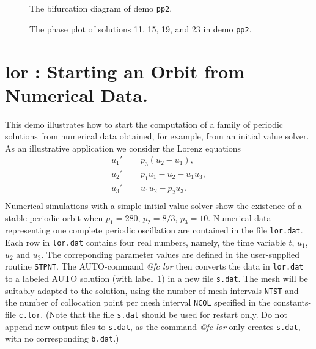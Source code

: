 \documentclass[12pt]{report}
\begin{document}
\begin{figure}[p]
\epsfysize 9.0cm
\centerline{}
\caption{The bifurcation diagram of demo {\tt pp2}.}
\label{fig:pp2_1}
\end{figure}

\begin{figure}[p]
\epsfysize 9.0cm
\centerline{}
\caption{The phase plot of solutions 11, 15, 19, and 23 in demo {\tt pp2}.}
\label{fig:pp2_2}
\end{figure}


\newpage
\section{ lor : Starting an Orbit from Numerical Data.} \label{sec:Demos_lor}
This demo illustrates how to start the computation of a family of
periodic solutions from numerical data obtained, for example, from an
initial value solver.
As an illustrative application we consider the Lorenz equations
\begin{equation} \begin{array}{cl}
  u_1' &=  p_3 (u_2 - u_1), \\
  u_2' &=  p_1 u_1 - u_2 - u_1 u_3,  \\
  u_3' &=  u_1 u_2 - p_2 u_3. \\\end{array} \end{equation}
Numerical simulations with a simple initial value solver show the
existence of a stable periodic orbit when $p_1=280$, $p_2=8/3$, $p_3=10$.
Numerical data representing one complete periodic oscillation are
contained in the file {\tt lor.dat}. 
Each row in {\tt lor.dat} contains four real numbers, namely,
the time variable $t$, $u_1$, $u_2$ and $u_3$.
The correponding parameter values are defined in the user-supplied routine
{\tt STPNT}.
The {\cal AUTO}-command {\it @fc lor} then converts the data in {\tt lor.dat}
to a labeled
{\cal AUTO} solution (with label~1) in a new file {\tt s.dat}.
The mesh will be suitably adapted to the solution, using the number of
mesh intervals {\tt NTST} and the number of collocation point per mesh
interval {\tt NCOL} specified in the constants-file {\tt c.lor}.
(Note that the file {\tt s.dat} should be used for restart only.
Do not append new output-files to {\tt s.dat}, as the command {\it @fc lor}
only creates {\tt s.dat}, with no corresponding {\tt b.dat}.)
\end{document}
